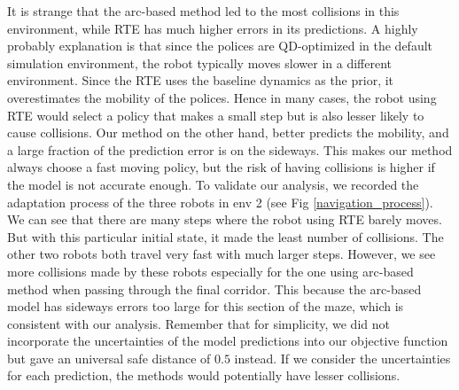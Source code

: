 It is strange that the arc-based method led to the most collisions in this environment, while RTE has much higher errors in its predictions.
A highly probably explanation is that since the polices are QD-optimized in the default simulation environment, the robot typically moves slower in a different environment.
Since the RTE uses the baseline dynamics as the prior, it overestimates the mobility of the polices.
Hence in many cases, the robot using RTE would select a policy that makes a small step but is also lesser likely to cause collisions.
Our method on the other hand, better predicts the mobility, and a large fraction of the prediction error is on the sideways.
This makes our method always choose a fast moving policy, but the risk of having collisions is higher if the model is not accurate enough.
To validate our analysis, we recorded the adaptation process of the three robots in env 2 (see Fig \ref{navigation_process}).
We can see that there are many steps where the robot using RTE barely moves.  
But with this particular initial state, it made the least number of collisions.
The other two robots both travel very fast with much larger steps.
However, we see more collisions made by these robots especially for the one using arc-based method when passing through the final corridor.
This because the arc-based model has sideways errors too large for this section of the maze, which is consistent with our analysis.
Remember that for simplicity, we did not incorporate the uncertainties of the model predictions into our objective function but gave an universal safe distance of $0.5$ instead.
If we consider the uncertainties for each prediction, the methods would potentially have lesser collisions.